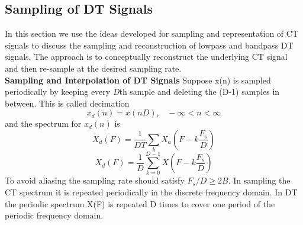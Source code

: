 \documentclass{article} %
\begin{document}
	\subsection{Sampling of DT Signals}
	In this section we use the ideas developed for sampling and representation of CT signals to discuss the sampling and reconstruction of lowpass and bandpass DT signals. The approach is to conceptually reconstruct the underlying CT signal and then re-sample at the desired sampling rate. \\
	\textbf{Sampling and Interpolation of DT Signals}
	Suppose x(n) is sampled periodically by keeping every \textit{D}th sample and deleting the (D-1) samples in between. This is called decimation
	\begin{equation}
	x_d(n) = x(nD), \;\;\; -\infty < n < \infty
	\end{equation}
	and the spectrum for $x_d(n)$ is 
	\begin{equation}
	X_d(F) = \frac{1}{DT}\sum_k X_a(F - k\frac{F_s}{D})
	\end{equation}
	\begin{equation}
	X_d(F) = \frac{1}{D}\sum_{k=0}^{D-1} X(F - k \frac{F_s}{D})
	\end{equation}
	To avoid aliasing the sampling rate should satisfy $F_s/D \ge 2B$. In sampling the CT spectrum it is repeated periodically in the discrete frequency domain. In DT the periodic spectrum X(F) is repeated D times to cover one period of the periodic frequency domain. 
	
\end{document}
